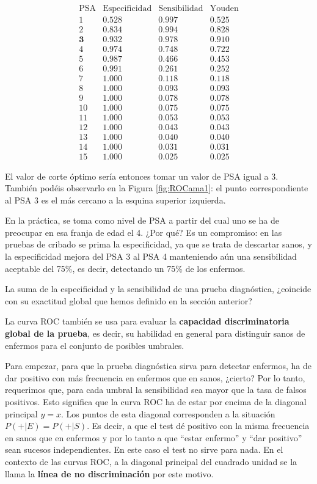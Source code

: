 \documentclass[
]{book}
\theoremstyle{definition}
\theoremstyle{definition}
\theoremstyle{definition}
\theoremstyle{definition}
\theoremstyle{remark}
\begin{document}
\[
\begin{array}{c|ccc}
\text{PSA} & \text{Especificidad}& \text{Sensibilidad} & \text{Youden}\\ \hline
1 & 0.528& 0.997& 0.525 \\
2 &  0.834  &0.994& 0.828\\
\mathbf{3} & \mathbf{0.932}  &\mathbf{0.978}& \mathbf{0.910} \\
4 & 0.974  &0.748& 0.722\\
5 & 0.987  &0.466&0.453 \\
6 & 0.991  &0.261&0.252 \\
7 & 1.000  &0.118&0.118 \\
8 & 1.000 &0.093& 0.093\\
9 & 1.000  &0.078& 0.078\\
10 & 1.000  &0.075& 0.075\\
11 & 1.000  &0.053& 0.053\\
12 & 1.000  & 0.043& 0.043 \\
13 & 1.000  &0.040& 0.040\\
14 & 1.000  & 0.031& 0.031\\
15 & 1.000  & 0.025& 0.025
\end{array}
\]

El valor de corte óptimo sería entonces tomar un valor de PSA igual a 3. También podéis observarlo en la Figura \ref{fig:ROCama1}: el punto correspondiente al PSA 3 es el más cercano a la esquina superior izquierda.

En la práctica, se toma como nivel de PSA a partir del cual uno se ha de preocupar en esa franja de edad el 4. ¿Por qué? Es un compromiso: en las pruebas de cribado se prima la especificidad, ya que se trata de descartar sanos, y la especificidad mejora del PSA 3 al PSA 4 manteniendo aún una sensibilidad aceptable del 75\%, es decir, detectando un 75\% de los enfermos.

\begin{rmdexercici}
La suma de la especificidad y la sensibilidad de una prueba diagnóstica, ¿coincide con su exactitud global que hemos definido en la sección anterior?
\end{rmdexercici}

La curva ROC también se usa para evaluar la \textbf{capacidad discriminatoria global de la prueba}, es decir, su habilidad en general para distinguir sanos de enfermos para el conjunto de posibles umbrales.

Para empezar, para que la prueba diagnóstica sirva para detectar enfermos, ha de dar positivo con más frecuencia en enfermos que en sanos, ¿cierto?
Por lo tanto, requerimos que, para cada umbral la sensibilidad sea mayor que la tasa de falsos positivos. Esto significa que la curva ROC ha de estar por encima de la diagonal principal \(y=x\). Los puntos de esta diagonal corresponden a la situación \(P(+|E)=P(+|S)\). Es decir, a que el test dé positivo con la misma frecuencia en sanos que en enfermos y por lo tanto a que ``estar enfermo'' y ``dar positivo'' sean sucesos independientes. En este caso el test no sirve para nada. En el contexto de las curvas ROC, a la diagonal principal del cuadrado unidad se la llama la \textbf{línea de no discriminación} por este motivo.
\end{document}
